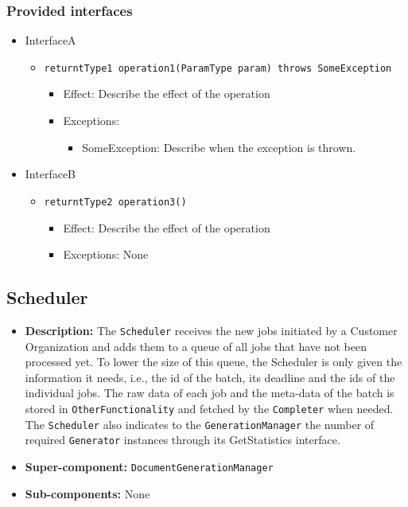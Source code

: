 \documentclass[a4paper,10pt]{article}
\begin{document}
\subsubsection*{Provided interfaces}
\begin{itemize}
    \item InterfaceA
    \begin{itemize}
        \item \texttt{returntType1 operation1(ParamType param) throws SomeException}
        \begin{itemize}
            \item Effect: Describe the effect of the operation
            \item Exceptions:
            \begin{itemize}
                \item SomeException: Describe when the exception is thrown.
            \end{itemize}
        \end{itemize}
    \end{itemize}

    \item InterfaceB
    \begin{itemize}
        \item \texttt{returntType2 operation3()}
        \begin{itemize}
            \item Effect: Describe the effect of the operation
            \item Exceptions: None
        \end{itemize}
    \end{itemize}
\end{itemize}

\subsection{Scheduler}
\begin{itemize}
    \item \textbf{Description:} The \texttt{Scheduler} receives the new jobs initiated by a Customer Organization and adds them to a queue of all jobs that have not been processed yet. To lower the size of this queue, the Scheduler is only given the information it needs, i.e., the id of the batch, its deadline and the ids of the individual jobs. The raw data of each job and the meta-data of the batch is stored in \texttt{OtherFunctionality} and fetched by the \texttt{Completer} when needed.\\
    The \texttt{Scheduler} also indicates to the \texttt{GenerationManager} the number of required \texttt{Generator} instances through its GetStatistics interface.
    \item \textbf{Super-component:} \texttt{DocumentGenerationManager}
    \item \textbf{Sub-components:} None
\end{itemize}
\end{document}
